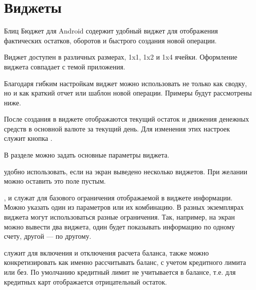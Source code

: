 \documentclass[a4paper,10pt,russian]{sphinxmanual}
\begin{document}
\section{Виджеты}
\label{\detokenize{widgets:id2}}
\sphinxAtStartPar
Блиц Бюджет для Android содержит удобный виджет для отображения фактических остатков, оборотов и быстрого создания новой операции.


\sphinxAtStartPar
Виджет доступен в различных размерах, 1x1, 1x2 и 1x4 ячейки. Оформление виджета совпадает с темой приложения.

\sphinxAtStartPar
Благодаря гибким настройкам виджет можно использовать не только как сводку, но и как краткий отчет или шаблон
новой операции. Примеры будут рассмотрены ниже.

\noindent{}
\noindent{}
\noindent{}

\sphinxAtStartPar
После создания в виджете отображаются текущий остаток и движения денежных средств в основной валюте за текущий день.
Для изменения этих настроек служит кнопка .

\sphinxAtStartPar
В разделе  можно задать основные параметры виджета.

\sphinxAtStartPar
{} удобно использовать, если на экран выведено несколько виджетов. При желании можно оставить это поле
пустым.

\sphinxAtStartPar
{},  и  служат для базового ограничения отображаемой в
виджете информации. Можно указать один из параметров или их комбинацию. В разных экземплярах виджета могут использоваться
разные ограничения. Так, например, на экран можно вывести два виджета, один будет показывать информацию по одному счету,
другой — по другому.

\sphinxAtStartPar
{}  служит для включения и отключения расчета баланса, также можно конкретизировать как именно
рассчитывать баланс, с учетом кредитного лимита или без. По умолчанию кредитный лимит не учитывается в балансе, т.е. для
кредитных карт отображается отрицательный остаток.
\end{document}
